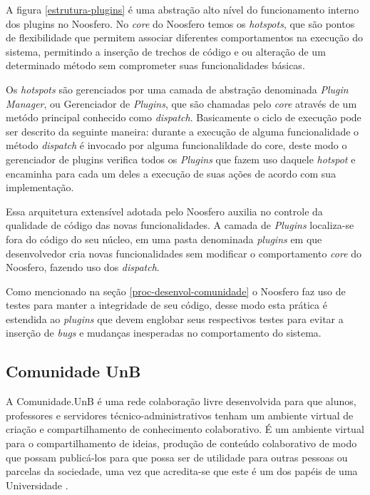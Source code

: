 A figura \ref{estrutura-plugins} é uma abstração alto nível do funcionamento interno dos plugins no Noosfero. No \textit{core} do Noosfero temos os \textit{hotspots}, que são pontos de flexibilidade que permitem associar diferentes comportamentos na execução do sistema, permitindo a inserção de trechos de código e ou alteração de um determinado método sem comprometer suas funcionalidades básicas.

Os \textit{hotspots} são gerenciados por uma camada de abstração denominada \textit{Plugin Manager}, ou Gerenciador de \textit{Plugins}, que são chamadas pelo \textit{core} através de um metódo principal conhecido como \textit{dispatch}. Basicamente o ciclo de execução pode ser descrito da seguinte maneira: durante a execução de alguma funcionalidade o método \textit{dispatch} é invocado por alguma funcionalildade do core, deste modo o gerenciador de plugins verifica todos os \textit{Plugins} que fazem uso daquele \textit{hotspot} e encaminha para cada um deles a execução de suas ações de acordo com sua implementação.

Essa arquitetura extensível adotada pelo Noosfero auxilia no controle da qualidade de código das novas funcionalidades. A camada de \textit{Plugins} localiza-se fora do código do seu núcleo, em uma pasta denominada \textit{plugins} em que desenvolvedor cria novas funcionalidades sem modificar o comportamento \textit{core} do Noosfero, fazendo uso dos \textit{dispatch}.

Como mencionado na seção \ref{proc-desenvol-comunidade} o Noosfero faz uso de testes para manter a integridade de seu código, desse modo esta prática é estendida ao \textit{plugins} que devem englobar seus respectivos testes para evitar a inserção de \textit{bugs} e mudanças inesperadas no comportamento do sistema.

\subsection{Comunidade UnB}
\label{comunidade-unb}

A Comunidade.UnB é uma rede colaboração livre desenvolvida para que alunos, professores e servidores técnico-administrativos tenham um ambiente virtual de criação e compartilhamento de conhecimento colaborativo. É um ambiente virtual para o compartilhamento de ideias, produção de conteúdo colaborativo de modo que possam publicá-los para que possa ser de utilidade para outras pessoas ou parcelas da sociedade, uma vez que acredita-se que este é um dos papéis de uma Universidade \cite{bucher2013rede}.

